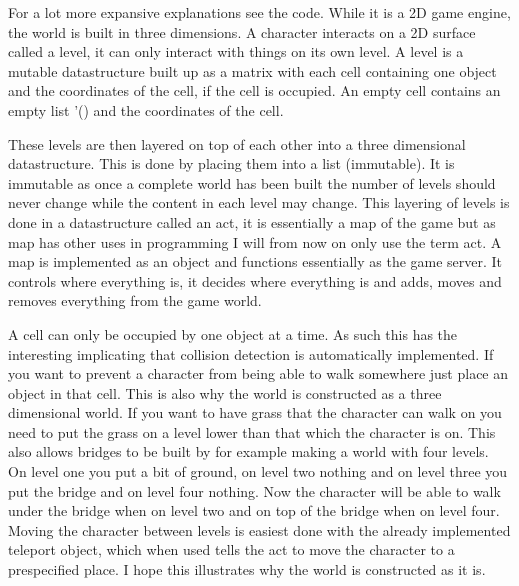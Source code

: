 \documentclass[12pt,a4paper]{article}
\begin{document}
For a lot more expansive explanations see the code.
While it is a 2D game engine, the world is built in three dimensions.
A character interacts on a 2D surface called a level, it can only interact with things on its own level.
A level is a mutable datastructure built up as a matrix with each cell containing one object and the coordinates of the cell, if the cell is occupied. An empty cell contains an empty list '() and the coordinates of the cell. 


These levels are then layered on top of each other into a three dimensional datastructure. This is done by placing them into a list (immutable). It is immutable as once a complete world has been built the number of levels should never change while the content in each level may change.
This layering of levels is done in a datastructure called an act, it is essentially a map of the game but as map has other uses in programming I will from now on only use the term act. A map is implemented as an object and functions essentially as the game server. It controls where everything is, it decides where everything is and adds, moves and removes everything from the game world.


A cell can only be occupied by one object at a time. As such this has the interesting implicating that collision detection is automatically implemented. If you want to prevent a character from being able to walk somewhere just place an object in that cell. This is also why the world is constructed as a three dimensional world. If you want to have grass that the character can walk on you need to put the grass on a level lower than that which the character is on. This also allows bridges to be built by for example making a world with four levels. On level one you put a bit of ground, on level two nothing and on level three you put the bridge and on level four nothing.
Now the character will be able to walk under the bridge when on level two and on top of the bridge when on level four. Moving the character between levels is easiest done with the already implemented teleport object, which when used tells the act to move the character to a prespecified place.
I hope this illustrates why the world is constructed as it is.


\end{document}
